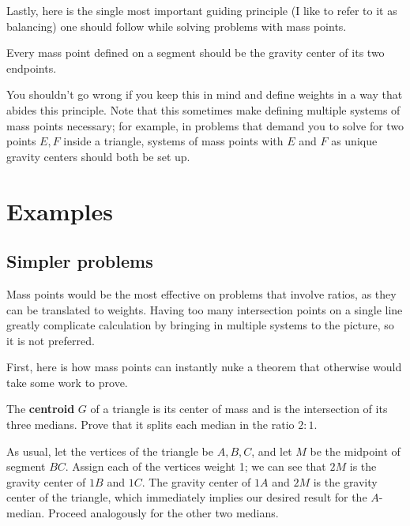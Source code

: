 \documentclass{article}
\begin{document}
Lastly, here is the single most important guiding principle (I like to refer to it as balancing) one should follow while solving problems with mass points. 

\begin{theo}
Every mass point defined on a segment should be the gravity center of its two endpoints.
\end{theo}

You shouldn't go wrong if you keep this in mind and define weights in a way that abides this principle. Note that this sometimes make defining multiple systems of mass points necessary; for example, in problems that demand you to solve for two points $E,F$ inside a triangle, systems of mass points with $E$ and $F$ as unique gravity centers should both be set up.

\section{Examples}
\subsection{Simpler problems}
Mass points would be the most effective on problems that involve ratios, as they can be translated to weights. Having too many intersection points on a single line greatly complicate calculation by bringing in multiple systems to the picture, so it is not preferred.

First, here is how mass points can instantly nuke a theorem that otherwise would take some work to prove.
\begin{exam}
The \textbf{centroid} $G$ of a triangle is its center of mass and is the intersection of its three medians. Prove that it splits each median in the ratio $2:1$.
\end{exam}
\begin{sol}
As usual, let the vertices of the triangle be $A,B,C$, and let $M$ be the midpoint of segment $BC$. Assign each of the vertices weight 1; we can see that $2M$ is the gravity center of $1B$ and $1C$. The gravity center of $1A$ and $2M$ is the gravity center of the triangle, which immediately implies our desired result for the $A$-median. Proceed analogously for the other two medians.
\end{sol}
\end{document}
